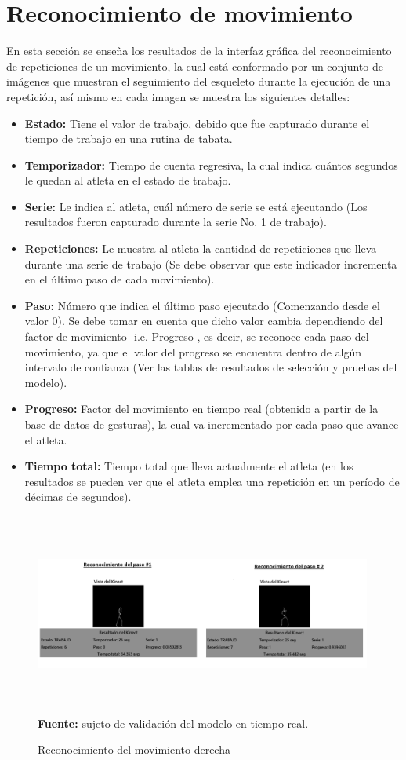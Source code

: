 \section{Reconocimiento de movimiento}
En esta secci\'on se ense\~na los resultados de la interfaz gr\'afica del reconocimiento de repeticiones de un movimiento, la cual est\'a conformado por un conjunto de im\'agenes que muestran el seguimiento del esqueleto durante la ejecuci\'on de una repetici\'on, as\'i mismo en cada imagen se muestra los siguientes detalles:
\begin{itemize}
\item \textbf{Estado:} Tiene el valor de trabajo, debido que fue capturado durante el tiempo de trabajo en una rutina de tabata.
\item \textbf{Temporizador:} Tiempo de cuenta regresiva, la cual indica cu\'antos segundos le quedan al atleta en el estado de trabajo.
\item \textbf{Serie:} Le indica al atleta, cu\'al n\'umero de serie se est\'a ejecutando (Los resultados fueron capturado durante la serie No. 1 de trabajo).
\item \textbf{Repeticiones:} Le muestra al atleta la cantidad de repeticiones que lleva durante una   serie de trabajo (Se debe observar que este indicador incrementa en el \'ultimo paso de cada movimiento).
\item \textbf{Paso:} N\'umero que indica el \'ultimo paso ejecutado (Comenzando desde el valor 0). Se debe tomar en cuenta que dicho valor cambia dependiendo del factor de movimiento -i.e. Progreso-, es decir, se  reconoce cada paso del movimiento, ya que el valor del progreso se encuentra dentro de alg\'un intervalo de confianza (Ver las tablas de resultados de selecci\'on y pruebas del modelo).
\item \textbf{Progreso:} Factor del movimiento en tiempo real (obtenido a partir de la base de datos de gesturas), la cual va incrementado por cada paso que avance el atleta.
\item \textbf{Tiempo total:} Tiempo total que lleva actualmente el atleta (en los resultados se pueden ver que el atleta emplea una repetici\'on en un per\'iodo de d\'ecimas de segundos).
\end{itemize}
\begin{figure}[H]
	\caption{Reconocimiento del movimiento derecha}
	\label{fig:recognitionTenis}
	\centering
	\includegraphics[width=420px,height=250px]{graphics/resultados/recognitionTennis.png} \\
	\textbf{Fuente:} sujeto de validaci\'on del modelo en tiempo real.
\end{figure}
